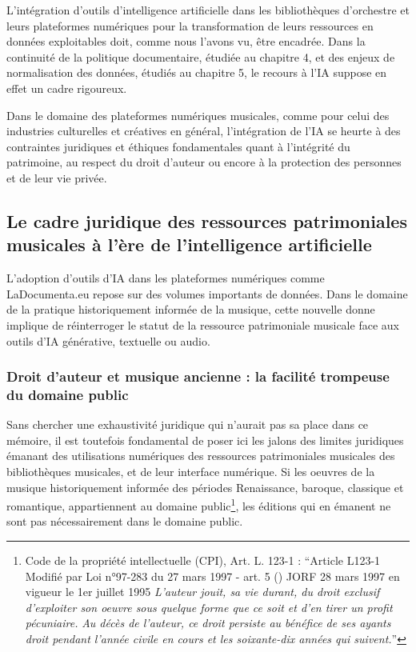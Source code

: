 L'intégration d'outils d'intelligence artificielle dans les bibliothèques d'orchestre et leurs plateformes numériques pour la transformation de leurs ressources en données exploitables doit, comme nous l'avons vu, être encadrée. 
Dans la continuité de la politique documentaire, étudiée au chapitre 4, et des enjeux de normalisation des données, étudiés au chapitre 5, le recours à l'IA suppose en effet un cadre rigoureux. 

Dans le domaine des plateformes numériques musicales, comme pour celui des industries culturelles et créatives en général, l'intégration de l'IA se heurte à des contraintes juridiques et éthiques fondamentales quant à l'intégrité du patrimoine, au respect du droit d'auteur ou encore à la protection des personnes et de leur vie privée. 


\subsection*{Le cadre juridique des ressources patrimoniales musicales à l'ère de l'intelligence artificielle}

L'adoption d'outils d'IA dans les plateformes numériques comme LaDocumenta.eu repose sur des volumes importants de données. Dans le domaine de la pratique historiquement informée de la musique, cette nouvelle donne implique de réinterroger le statut de la ressource patrimoniale musicale face aux outils d'IA générative, textuelle ou audio.

\subsubsection*{Droit d'auteur et musique ancienne : la facilité trompeuse du domaine public}

Sans chercher une exhaustivité juridique qui n'aurait pas sa place dans ce mémoire, il est toutefois fondamental de poser ici les jalons des limites juridiques émanant des utilisations numériques des ressources patrimoniales musicales des bibliothèques musicales, et de leur interface numérique.
Si les oeuvres de la musique historiquement informée des périodes Renaissance, baroque, classique et romantique, appartiennent au domaine public\footnote{Code de la propriété intellectuelle (CPI), Art. L. 123-1 : \enquote{Article L123-1 Modifié par Loi n°97-283 du 27 mars 1997 - art. 5 () JORF 28 mars 1997 en vigueur le 1er juillet 1995
		\textit{L'auteur jouit, sa vie durant, du droit exclusif d'exploiter son oeuvre sous quelque forme que ce soit et d'en tirer un profit pécuniaire.}
		\textit{Au décès de l'auteur, ce droit persiste au bénéfice de ses ayants droit pendant l'année civile en cours et les soixante-dix années qui suivent.}}
}, les éditions qui en émanent ne sont pas nécessairement dans le domaine public. 

